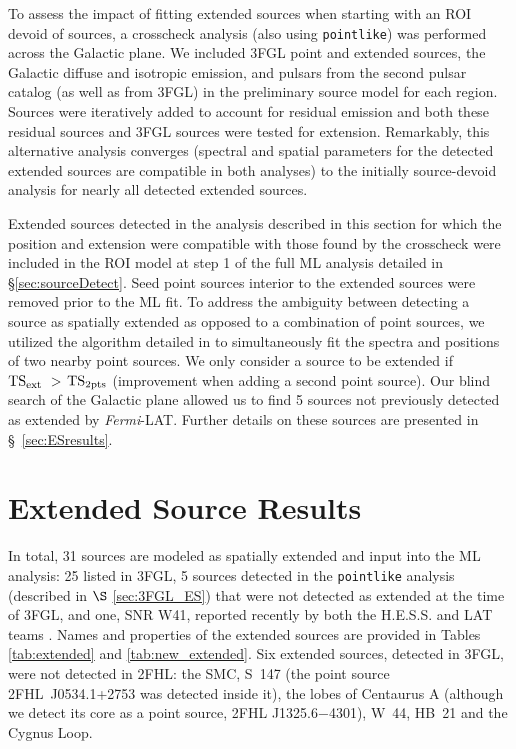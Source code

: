 { To assess the impact of fitting extended sources when starting with an ROI devoid of sources, a crosscheck analysis (also using {\tt pointlike}) was performed across the Galactic plane. We included 3FGL point and extended sources, the Galactic diffuse and isotropic emission, and pulsars from the second \lat pulsar catalog \citep{2PC} (as well as from 3FGL) in the preliminary source model for each region. Sources were iteratively added to account for residual emission and both these residual sources and 3FGL  sources were tested for extension. Remarkably, this alternative analysis converges (\ie spectral and spatial parameters for the detected extended sources are compatible in both analyses) to the initially source-devoid analysis for nearly all detected extended sources.
}

Extended sources detected in the analysis described in this section for which the position and extension  were compatible with those found by the crosscheck were included in the ROI model at step 1 of the full ML analysis detailed in \S\ref{sec:sourceDetect}. Seed point sources interior to the extended sources were removed prior to the ML fit. { To address the ambiguity between detecting a source as spatially extended as opposed to a combination of point sources, we utilized the algorithm detailed in \cite{Lande12} to simultaneously fit the spectra and positions of two nearby point sources. We only consider a source to be extended if $\rm TS_{ext}~ >$ $\rm TS_{2pts}$  (improvement when adding a second point source).} Our blind search of the Galactic plane allowed us to find 5 sources not previously detected as extended by {\it Fermi}-LAT.  Further details on these sources are presented in \S~\ref{sec:ESresults}.


\section{\label{sec:ESresults}Extended Source Results}


In total, 31 sources are modeled as spatially extended and input into the ML analysis: 25 listed in 3FGL, 5 sources detected in the {\tt pointlike} analysis (described in $\S$ \ref{sec:3FGL_ES}) that were not { detected as extended at the time of} 3FGL, and one, SNR W41, reported  recently by both the H.E.S.S. and LAT teams \citep{HESSLATW41}. Names and properties of the extended sources  are provided in Tables \ref{tab:extended} and \ref{tab:new_extended}. 
Six extended sources, detected in 3FGL, were not detected in 2FHL: the SMC, S~147 ({the point source 2FHL~J0534.1+2753 was detected inside it}), the lobes of Centaurus A (although we detect its core as a point source, 2FHL J1325.6$-$4301), W~44, HB~21 and the Cygnus Loop.


